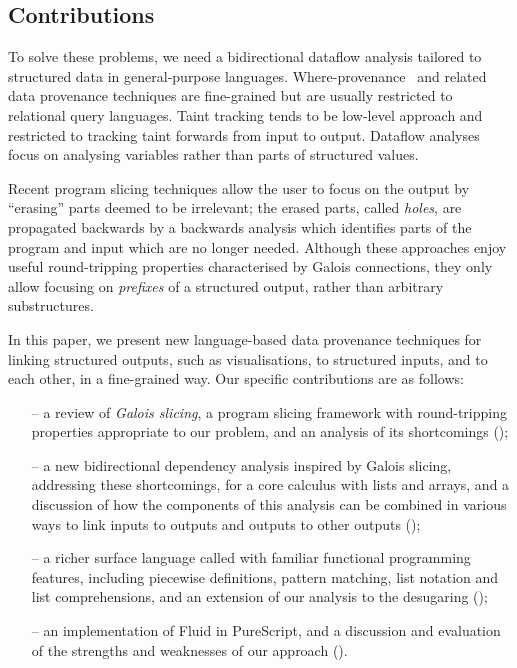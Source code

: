 \subsection{Contributions}

To solve these problems, we need a bidirectional dataflow analysis tailored to structured data in general-purpose languages. Where-provenance~\cite{buneman01} and related data provenance techniques are fine-grained but are usually restricted to relational query languages. Taint tracking \cite{newsome05} tends to be low-level approach and restricted to tracking taint forwards from input to output. Dataflow analyses \cite{reps95} focus on analysing variables rather than parts of structured values.

Recent program slicing techniques \cite{perera12a,perera13a,ricciotti17} allow the user to focus on the output by ``erasing'' parts deemed to be irrelevant; the erased parts, called \emph{holes}, are propagated backwards by a backwards analysis which identifies parts of the program and input which are no longer needed. Although these approaches enjoy useful round-tripping properties characterised by Galois connections, they only allow focusing on \emph{prefixes} of a structured output, rather than arbitrary substructures.

In this paper, we present new language-based data provenance techniques for linking structured outputs, such as visualisations, to structured inputs, and to each other, in a fine-grained way. Our specific contributions are as follows:

\begin{itemize}[leftmargin=*]
   \item[--] a review of \emph{Galois slicing}, a program slicing framework with round-tripping properties appropriate to our problem, and an analysis of its shortcomings ();
   \item[--] a new bidirectional dependency analysis inspired by Galois slicing, addressing these shortcomings, for a core calculus with lists and arrays, and a discussion of how the components of this analysis can be combined in various ways to link inputs to outputs and outputs to other outputs ();
   \item[--] a richer surface language called \OurLanguage with familiar functional programming features, including piecewise definitions, pattern matching, list notation and list comprehensions, and an extension of our analysis to the desugaring ();
   \item[--] an implementation of Fluid in PureScript, and a discussion and evaluation of the strengths and weaknesses of our approach ().
\end{itemize}
